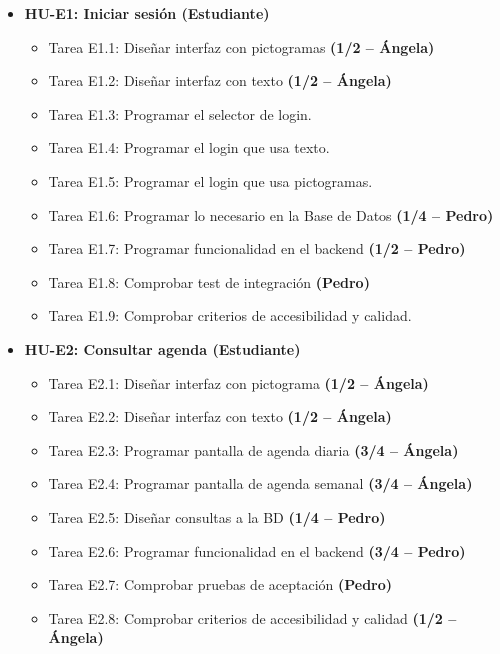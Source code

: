 \begin{itemize}[leftmargin=1.2em, itemsep=4pt]
    \item \textbf{HU-E1: Iniciar sesión (Estudiante)}
    \begin{itemize}[label=$\circ$, leftmargin=1.5em, itemsep=2pt]
        \item \textsf{Tarea E1.1:} Diseñar interfaz con pictogramas \hfill \textbf{(1/2 -- Ángela)}
        \item \textsf{Tarea E1.2:} Diseñar interfaz con texto \hfill \textbf{(1/2 -- Ángela)}
        \item \textsf{Tarea E1.3:} Programar el selector de login.
        \item \textsf{Tarea E1.4:} Programar el login que usa texto.
        \item \textsf{Tarea E1.5:} Programar el login que usa pictogramas.
        \item \textsf{Tarea E1.6:} Programar lo necesario en la Base de Datos \hfill \textbf{(1/4 -- Pedro)}
        \item \textsf{Tarea E1.7:} Programar funcionalidad en el backend \hfill \textbf{(1/2 -- Pedro)}
        \item \textsf{Tarea E1.8:} Comprobar test de integración \hfill \textbf{(Pedro)}
        \item \textsf{Tarea E1.9:} Comprobar criterios de accesibilidad y calidad.
    \end{itemize}

    \item \textbf{HU-E2: Consultar agenda (Estudiante)}
    \begin{itemize}[label=$\circ$, leftmargin=1.5em, itemsep=2pt]
        \item \textsf{Tarea E2.1:} Diseñar interfaz con pictograma \hfill \textbf{(1/2 -- Ángela)}
        \item \textsf{Tarea E2.2:} Diseñar interfaz con texto \hfill \textbf{(1/2 -- Ángela)}
        \item \textsf{Tarea E2.3:} Programar pantalla de agenda diaria \hfill \textbf{(3/4 -- Ángela)}
        \item \textsf{Tarea E2.4:} Programar pantalla de agenda semanal \hfill \textbf{(3/4 -- Ángela)}
        \item \textsf{Tarea E2.5:} Diseñar consultas a la BD \hfill \textbf{(1/4 -- Pedro)}
        \item \textsf{Tarea E2.6:} Programar funcionalidad en el backend \hfill \textbf{(3/4 -- Pedro)}
        \item \textsf{Tarea E2.7:} Comprobar pruebas de aceptación \hfill \textbf{(Pedro)}
        \item \textsf{Tarea E2.8:} Comprobar criterios de accesibilidad y calidad \hfill \textbf{(1/2 -- Ángela)}
    \end{itemize}


\end{itemize}
